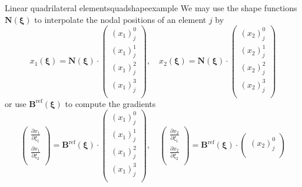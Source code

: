 \begin{example}{Linear quadrilateral elements}{quadshapeexample}
    We may use the shape functions $\mathbf{N}(\pmb{\xi})$ to interpolate the nodal positions of an element $j$ by 
    \begin{equation}
        x_1(\pmb{\xi})
        = 
        \mathbf{N}(\pmb{\xi})
        \cdot 
        \begin{pmatrix}
            {(x_1)}_j^0 \\
            {(x_1)}_j^1 \\
            {(x_1)}_j^2 \\
            {(x_1)}_j^3 \\
        \end{pmatrix}
        , \quad
        x_2(\pmb{\xi})
        = 
        \mathbf{N}(\pmb{\xi})
        \cdot 
        \begin{pmatrix}
            {(x_2)}_j^0 \\
            {(x_2)}_j^1 \\
            {(x_2)}_j^2 \\
            {(x_2)}_j^3 \\
        \end{pmatrix}
    \end{equation}
    or use $\mathbf{B}^\textrm{ref}(\pmb{\xi})$ to compute the gradients
    \begin{equation}
        \begin{pmatrix}
            \frac{\partial x_1}{\partial \xi_1} \\
            \frac{\partial x_1}{\partial \xi_2}\\
        \end{pmatrix}
        = 
        \mathbf{B}^\textrm{ref}(\pmb{\xi})
        \cdot 
        \begin{pmatrix}
            {(x_1)}_j^0 \\
            {(x_1)}_j^1 \\
            {(x_1)}_j^2 \\
            {(x_1)}_j^3 \\
        \end{pmatrix}
        , \quad
        \begin{pmatrix}
            \frac{\partial x_2}{\partial \xi_1} \\
            \frac{\partial x_2}{\partial \xi_2}\\
        \end{pmatrix}
        = 
        \mathbf{B}^\textrm{ref}(\pmb{\xi})
        \cdot 
        \begin{pmatrix}
            {(x_2)}_j^0 \\

\end{pmatrix}
\end{equation}
\end{example}
